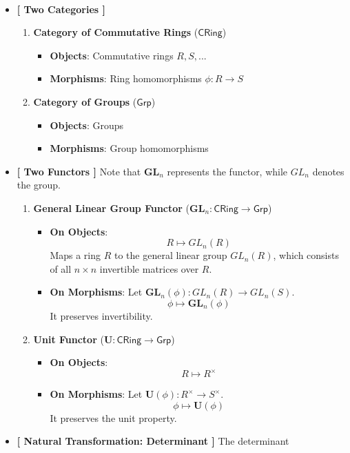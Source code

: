 \begin{example}[Determinant]
\ \begin{itemize}
	\item[] \textbf{[ Two Categories ]}
	\begin{enumerate}
		\item \textbf{Category of Commutative Rings} ($\mathsf{CRing}$)
		\begin{itemize}
			\item \textbf{Objects}: Commutative rings $R,S,...$
			\item \textbf{Morphisms}: Ring homomorphisms $\phi:R\to S$
		\end{itemize}
		\item \textbf{Category of Groups} ($\mathsf{Grp}$)
		\begin{itemize}
			\item \textbf{Objects}: Groups
			\item \textbf{Morphisms}: Group homomorphisms
		\end{itemize}
	\end{enumerate}
	\item[] \textbf{[ Two Functors ]} Note that $\mathbf{GL}_n$ represents the functor, while $GL_n$ denotes the group.
	\begin{enumerate}
		\item \textbf{General Linear Group Functor} ($\mathbf{GL}_n:\mathsf{CRing}\to\mathsf{Grp}$)
		\begin{itemize}
			\item \textbf{On Objects}: \[
			R\mapsto GL_n(R)
			\] Maps a ring $R$ to the general linear group $GL_n(R)$, which consists of all $n\times n$ invertible matrices over $R$.
			\item \textbf{On Morphisms}: Let $\mathbf{GL}_n(\phi):GL_n(R)\to GL_n(S)$. \[
			\phi\mapsto\mathbf{GL}_n(\phi)
			\] It preserves invertibility.
		\end{itemize}
		\item \textbf{Unit Functor} ($\mathbf{U}:\mathsf{CRing}\to\mathsf{Grp}$)
		\begin{itemize}
			\item \textbf{On Objects}: \[
			R\mapsto R^{\times}
			\]
			\item \textbf{On Morphisms}: Let $\mathbf{U}(\phi):R^{\times}\to S^{\times}$. \[
			\phi\mapsto\mathbf{U}(\phi)
			\] It preserves the unit property.
		\end{itemize}
	\end{enumerate}
	\newpage
	\item \textbf{[ Natural Transformation: Determinant ]} The determinant \[
\]
\end{itemize}
\end{example}
